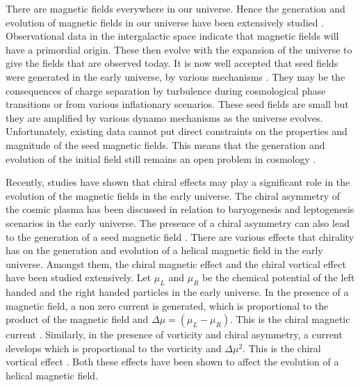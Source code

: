 \documentclass{ws-mpla}
\begin{document}
There are magnetic fields everywhere in our universe. Hence the generation and evolution of magnetic fields in our universe have been extensively studied \cite{Grasso:2000wj}. 
Observational data in the intergalactic space indicate that magnetic fields will have a primordial origin. These then evolve with the expansion 
of the universe to give the fields that are observed today. It is now well accepted that seed fields were generated in the early universe, by various 
mechanisms \cite{Widrow:2002ud,Widrow:2011hs}. They may be the consequences of charge separation by turbulence during cosmological phase transitions or from 
various inflationary scenarios. 
These seed fields are small but they are amplified by various dynamo mechanisms as the universe evolves. Unfortunately, existing data cannot put 
direct constraints on the properties and magnitude of the seed magnetic fields. This means that the generation and evolution of the initial field still remains 
an open problem in cosmology \cite{Durrer} . 


Recently, studies have shown that chiral effects may play a significant role in the evolution of the magnetic fields in the early universe. The chiral 
asymmetry of the cosmic plasma  has been discussed in relation to baryogenesis and leptogenesis scenarios in the early universe. The presence of a 
chiral asymmetry can also lead to the generation of a seed magnetic field \cite{long,sydorenko,anand}. There are various effects that chirality has on the generation 
and evolution of a helical magnetic field in the early universe. Amongst them, the chiral magnetic effect and the chiral vortical effect have been studied 
\cite{tashiro,ruchaivsky} extensively. Let $\mu_L$ and $\mu_R $ be the chemical potential of the left handed and the right handed particles in the early universe.
In the presence of a magnetic field, a non zero current is generated, which is proportional to the product of the magnetic field and $\Delta \mu = (\mu_L - \mu_R)$. This is 
the chiral magnetic current \cite{kharzeev,fukushima}. Similarly, in the presence of vorticity and chiral asymmetry, a current develops which is proportional to 
the vorticity and $\Delta\mu^2$. This is the chiral vortical effect \cite{tashiro,son}. Both these effects have been shown to 
affect the evolution of a helical magnetic field. 
\end{document}
